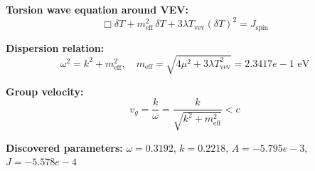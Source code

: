 
\textbf{Torsion wave equation around VEV:}
\begin{equation}
  \Box \delta T + m_{\text{eff}}^2 \, \delta T + 3\lambda T_{\text{vev}} (\delta T)^2 = J_{\text{spin}}
\end{equation}

\textbf{Dispersion relation:}
\begin{equation}
  \omega^2 = k^2 + m_{\text{eff}}^2, \quad
  m_{\text{eff}} = \sqrt{4\mu^2 + 3\lambda T_{\text{vev}}^2} = 2.3417e-1 \text{ eV}
\end{equation}

\textbf{Group velocity:}
\begin{equation}
  v_g = \frac{k}{\omega} = \frac{k}{\sqrt{k^2 + m_{\text{eff}}^2}} < c
\end{equation}

\textbf{Discovered parameters:}
$\omega = 0.3192$, \quad
$k = 0.2218$, \quad
$A = -5.795e-3$, \quad
$J = -5.578e-4$